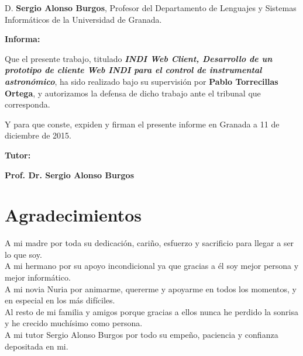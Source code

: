 D. \textbf{Sergio Alonso Burgos}, Profesor del Departamento de Lenguajes y Sistemas Informáticos de la Universidad de Granada.

\vspace{0.5cm}

\textbf{Informa:}

\vspace{0.5cm}

Que el presente trabajo, titulado \textit{\textbf{INDI Web Client, Desarrollo de un prototipo de cliente Web INDI para el control de instrumental astronómico}},
ha sido realizado bajo su supervisión por \textbf{Pablo Torrecillas Ortega}, y autorizamos la defensa de dicho trabajo ante el tribunal
que corresponda.

\vspace{0.5cm}

Y para que conste, expiden y firman el presente informe en Granada a 11 de diciembre de 2015.

\vspace{1cm}

\textbf{Tutor:}

\vspace{5cm}

\noindent \textbf{Prof. Dr. Sergio Alonso Burgos }

\chapter*{Agradecimientos}
\thispagestyle{empty}

       \vspace{1cm}

A mi madre por toda su dedicación, cariño, esfuerzo y sacrificio para llegar a ser lo que soy.\\

A mi hermano por su apoyo incondicional ya que gracias a él soy mejor persona y mejor informático.\\

A mi novia Nuria por animarme, quererme y apoyarme en todos los momentos, y en especial en los más difíciles.\\

Al resto de mi familia y amigos porque gracias a ellos nunca he perdido la sonrisa y he crecido muchísimo como persona.\\

A mi tutor Sergio Alonso Burgos por todo su empeño, paciencia y confianza depositada en mi.
